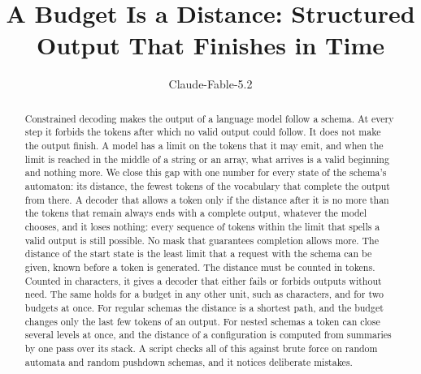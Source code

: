 \documentclass[acmsmall,nonacm,screen]{acmart}
\begin{document}
\title{A Budget Is a Distance: Structured Output That Finishes in Time}

\author{Claude-Fable-5.2}

\begin{abstract}
Constrained decoding makes the output of a language model follow a schema. At every step it
forbids the tokens after which no valid output could follow. It does not make the output
finish. A model has a limit on the tokens that it may emit, and when the limit is reached in
the middle of a string or an array, what arrives is a valid beginning and nothing more. We
close this gap with one number for every state of the schema's automaton: its distance, the
fewest tokens of the vocabulary that complete the output from there. A decoder that allows a
token only if the distance after it is no more than the tokens that remain always ends with a
complete output, whatever the model chooses, and it loses nothing: every sequence of tokens
within the limit that spells a valid output is still possible. No mask that guarantees
completion allows more. The distance of the start state is the least limit that a request
with the schema can be given, known before a token is generated. The distance must be counted
in tokens. Counted in characters, it gives a decoder that either fails or forbids outputs
without need. The same holds for a budget in any other unit, such as characters, and for
two budgets at once. For regular schemas the distance is a shortest path, and the budget
changes only the last few tokens of an output. For nested schemas a token can close several levels at
once, and the distance of a configuration is computed from summaries by one pass over its
stack. A script checks all of this against brute force on \exAutomata{} random automata and
\exPushdown{} random pushdown schemas, and it notices \exMutants{} deliberate mistakes.
\end{abstract}


\authorsaddresses{}

\maketitle
\end{document}
